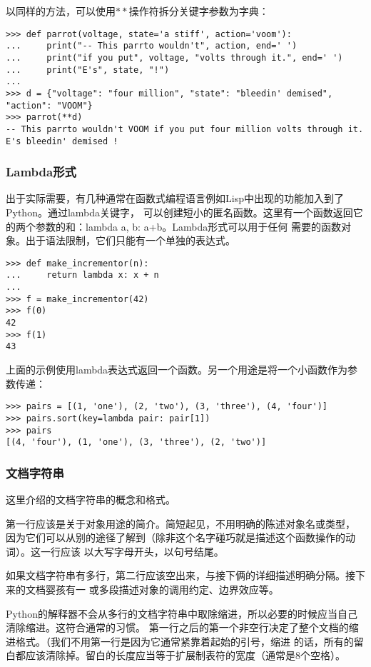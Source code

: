 \documentclass[UTF8]{ctexart}
\begin{document}
以同样的方法，可以使用$**$操作符拆分关键字参数为字典：
\begin{verbatim}
>>> def parrot(voltage, state='a stiff', action='voom'):
...     print("-- This parrto wouldn't", action, end=' ')
...     print("if you put", voltage, "volts through it.", end=' ')
...     print("E's", state, "!")
...
>>> d = {"voltage": "four million", "state": "bleedin' demised", "action": "VOOM"}
>>> parrot(**d)
-- This parrto wouldn't VOOM if you put four million volts through it. E's bleedin' demised !
\end{verbatim}

\subsubsection{Lambda形式}
出于实际需要，有几种通常在函数式编程语言例如Lisp中出现的功能加入到了Python。通过lambda关键字，
可以创建短小的匿名函数。这里有一个函数返回它的两个参数的和：lambda a, b: a+b。Lambda形式可以用于任何
需要的函数对象。出于语法限制，它们只能有一个单独的表达式。
\begin{verbatim}
>>> def make_incrementor(n):
...     return lambda x: x + n
...
>>> f = make_incrementor(42)
>>> f(0)
42
>>> f(1)
43
\end{verbatim}

上面的示例使用lambda表达式返回一个函数。另一个用途是将一个小函数作为参数传递：
\begin{verbatim}
>>> pairs = [(1, 'one'), (2, 'two'), (3, 'three'), (4, 'four')]
>>> pairs.sort(key=lambda pair: pair[1])
>>> pairs
[(4, 'four'), (1, 'one'), (3, 'three'), (2, 'two')]
\end{verbatim}

\subsubsection{文档字符串}
这里介绍的文档字符串的概念和格式。

第一行应该是关于对象用途的简介。简短起见，不用明确的陈述对象名或类型，
因为它们可以从别的途径了解到（除非这个名字碰巧就是描述这个函数操作的动词）。这一行应该
以大写字母开头，以句号结尾。

如果文档字符串有多行，第二行应该空出来，与接下俩的详细描述明确分隔。接下来的文档婴孩有一
或多段描述对象的调用约定、边界效应等。

Python的解释器不会从多行的文档字符串中取除缩进，所以必要的时候应当自己清除缩进。这符合通常的习惯。
第一行之后的第一个非空行决定了整个文档的缩进格式。（我们不用第一行是因为它通常紧靠着起始的引号，缩进
的话，所有的留白都应该清除掉。留白的长度应当等于扩展制表符的宽度（通常是8个空格）。
\end{document}
